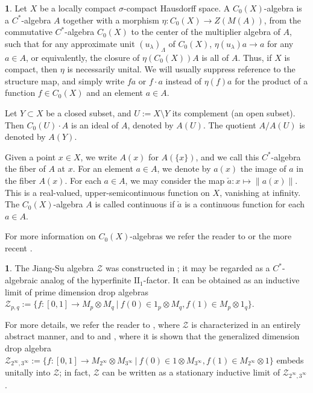 \documentclass{amsart}
\theoremstyle{definition}
\newtheorem{pargr}[lma]{}
\begin{document}
\begin{pargr}
\label{pargr:C_X_alg}
    Let $X$ be a locally compact $\sigma$-compact Hausdorff space.
    A $C_{0}(X)$-algebra is a {{$C^*$-al\-ge\-bra}}{} $A$ together with a morphism $\eta\colon C_0(X)\to Z(M(A))$, from the commutative {{$C^*$-al\-ge\-bra}}{} $C_0(X)$ to the center of the multiplier algebra of $A$, such that for any approximate unit $(u_{\lambda})_{\Lambda}$ of $C_0(X)$, $\eta(u_{\lambda}) a \to a $ for any  $a \in A$, or equivalently, the closure of $\eta(C_0(X)) A$ is all of $A$.
    Thus, if $X$ is compact, then $\eta$ is necessarily unital.
    We will usually suppress reference to the structure map, and simply write $fa$ or $f\cdot a$ instead of $\eta(f)a$ for the product of a function $f\in C_0(X)$ and an element $a\in A$.

    Let $Y\subset X$ be a closed subset, and $U:=X\setminus Y$ its complement (an open subset).
    Then $C_0(U)\cdot A$ is an ideal of $A$, denoted by $A(U)$.
    The quotient $A/A(U)$ is denoted by $A(Y)$.

    Given a point $x\in X$, we write $A(x)$ for $A(\{x\})$, and we call this {{$C^*$-al\-ge\-bra}}{} the fiber of $A$ at $x$.
    For an element $a\in A$, we denote by $a(x)$ the image of $a$ in the fiber $A(x)$.
    For each $a\in A$, we may consider the map $\check{a}\colon x\mapsto\|a(x)\|$.
    This is a real-valued, upper-semicontinuous function on $X$, vanishing at infinity.
    The $C_{0}(X)$-algebra $A$ is called continuous if $\check{a}$ is a continuous function for each $a\in A$.

    For more information on $C_{0}(X)$-algebras we refer the reader to \cite[\S 1]{Kas1988} or the more recent \cite[\S 2]{Dad2009}.
\end{pargr}

\begin{pargr}
\label{pargr:Z}
    The Jiang-Su algebra $\mathcal{Z}$ was constructed in \cite{JiaSu1999}; it may be regarded as a $C^{*}$-algebraic analog of the hyperfinite $\text{II}_1$-factor.
    It can be obtained as an inductive limit of prime dimension drop algebras
    $\mathcal{Z}_{p,q}:=\{f\colon[0,1]\to M_p\otimes M_q\ |\ f(0)\in 1_p\otimes M_q, f(1)\in M_p\otimes 1_q\}$.

    For more details, we refer the reader to \cite{Win2011}, where  $\mathcal{Z}$ is characterized in an entirely abstract manner, and to \cite{Ror2004} and \cite{RorWin2010}, where it is  shown that the generalized dimension drop algebra $\mathcal{Z}_{2^\infty,3^\infty}:=\{f\colon[0,1]\to M_{2^\infty}\otimes M_{3^\infty}\ |\ f(0)\in 1\otimes M_{3^\infty}, f(1)\in M_{2^\infty}\otimes 1\}$ embeds unitally into $\mathcal{Z}$; in fact, $\mathcal{Z}$ can be written as a stationary inductive limit of $\mathcal{Z}_{2^\infty,3^\infty}$.
\end{pargr}
\end{document}
